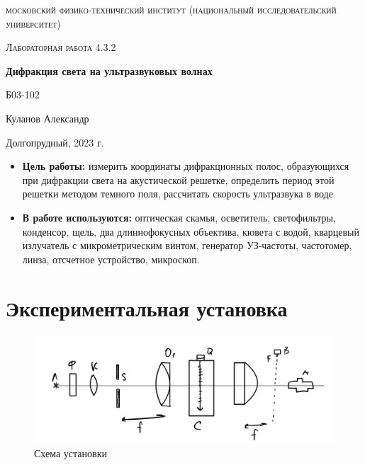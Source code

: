 \documentclass[a4paper, 12pt]{article}
\begin{document}
\begin{titlepage}
	\centering
	\vspace{5cm}
	{\scshape\LARGE московский физико-технический институт (национальный исследовательский университет) \par}
	\vspace{6cm}
	{\scshape\Large Лабораторная работа 4.3.2 \par}
	{\huge\bfseries Дифракция света на ультразвуковых волнах \par}
	\vspace{1cm}
	\vfill
\begin{flushright}
	{\large Б03-102}\par
	\vspace{0.3cm}
	{\LARGE Куланов Александр}
\end{flushright}
	

	\vfill


	Долгопрудный, 2023 г.
\end{titlepage}

\begin{itemize}
	\item \textbf{Цель работы:} измерить координаты дифракционных полос, образующихся при дифракции света на акустической решетке, определить период этой решетки методом темного поля, рассчитать скорость ультразвука в воде
    \item \textbf{В работе используются:} оптическая скамья, осветитель, светофильтры, конденсор, щель, два длиннофокусных объектива, кювета с водой, кварцевый излучатель с микрометрическим винтом, генератор УЗ-частоты, частотомер, линза, отсчетное устройство, микроскоп.
\end{itemize}

\section{Экспериментальная установка}
\begin{figure}[H]
    \centering
    \includegraphics[width=1\textwidth]{set}
    \caption{Схема установки}
    \label{fig:set}
\end{figure}
\end{document}

